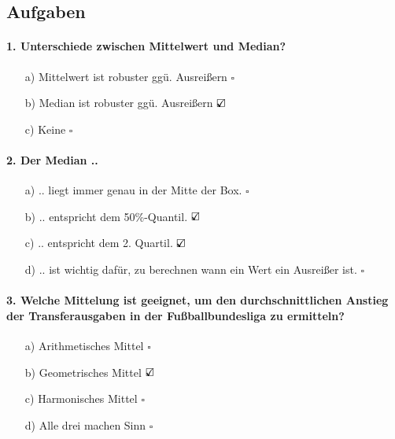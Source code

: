 \documentclass[a4paper]{article}
\begin{document}
\subsection{Aufgaben}

\paragraph{1. Unterschiede zwischen Mittelwert und Median?}

\begin{itemize}
    \item[a)] Mittelwert ist robuster ggü. Ausreißern \hfill $\square$
    \item[b)] Median ist robuster ggü. Ausreißern   \hfill $\text{\rlap{$\checkmark$}}\square$
    \item[c)] Keine \hfill $\square$
\end{itemize}

\paragraph{2. Der Median ..}

\begin{itemize}
    \item[a)] .. liegt immer genau in der Mitte der Box. \hfill $\square$
    \item[b)] .. entspricht dem 50\%-Quantil. \hfill $\text{\rlap{$\checkmark$}}\square$
    \item[c)] .. entspricht dem 2. Quartil. \hfill $\text{\rlap{$\checkmark$}}\square$
    \item[d)] .. ist wichtig dafür, zu berechnen wann ein Wert ein Ausreißer ist. \hfill $\square$
\end{itemize}

\paragraph{3. Welche Mittelung ist geeignet, um den durchschnittlichen Anstieg der Transferausgaben in der Fußballbundesliga zu ermitteln?}

\begin{itemize}
    \item[a)] Arithmetisches Mittel \hfill $\square$
    \item[b)] Geometrisches Mittel \hfill $\text{\rlap{$\checkmark$}}\square$
    \item[c)] Harmonisches Mittel \hfill $\square$
    \item[d)] Alle drei machen Sinn \hfill $\square$
\end{itemize}
\end{document}
